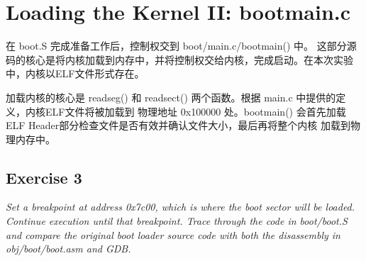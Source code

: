 \documentclass[12pt, letterpaper]{report}
\begin{document}
\section[\large Loading the Kernel II: bootmain.c]{Loading the Kernel II: bootmain.c}
{
        在 boot.S 完成准备工作后，控制权交到 boot/main.c/bootmain() 中。
        这部分源码的核心是将内核加载到内存中，并将控制权交给内核，完成启动。在本次实验中，内核以ELF文件形式存在。\par 
        加载内核的核心是 readseg() 和 readsect() 两个函数。根据 main.c 中提供的定义，内核ELF文件将被加载到
        物理地址 0x100000 处。bootmain() 会首先加载ELF Header部分检查文件是否有效并确认文件大小，最后再将整个内核
        加载到物理内存中。
} \par 

\subsection{\large Exercise 3}
\textsl{
        Set a breakpoint at address 0x7c00, 
        which is where the boot sector will be loaded. 
        Continue execution until that breakpoint. 
        Trace through the code in boot/boot.S 
        and compare the original boot loader source code with 
        both the disassembly in obj/boot/boot.asm and GDB.
} \par 
\end{document}
